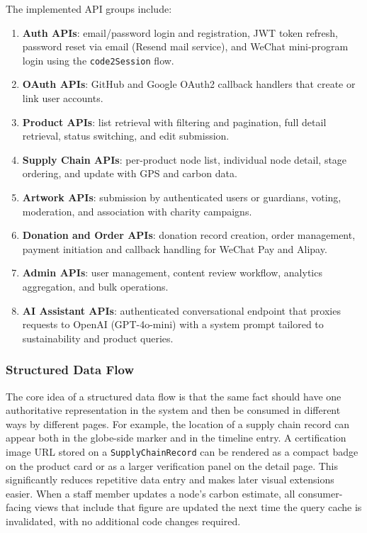 \documentclass[11pt]{article}
\begin{document}
The implemented API groups include:
\begin{enumerate}[leftmargin=2.2em]
    \item \textbf{Auth APIs}: email/password login and registration, JWT token refresh, password reset via email (Resend mail service), and WeChat mini-program login using the \texttt{code2Session} flow.
    \item \textbf{OAuth APIs}: GitHub and Google OAuth2 callback handlers that create or link user accounts.
    \item \textbf{Product APIs}: list retrieval with filtering and pagination, full detail retrieval, status switching, and edit submission.
    \item \textbf{Supply Chain APIs}: per-product node list, individual node detail, stage ordering, and update with GPS and carbon data.
    \item \textbf{Artwork APIs}: submission by authenticated users or guardians, voting, moderation, and association with charity campaigns.
    \item \textbf{Donation and Order APIs}: donation record creation, order management, payment initiation and callback handling for WeChat Pay and Alipay.
    \item \textbf{Admin APIs}: user management, content review workflow, analytics aggregation, and bulk operations.
    \item \textbf{AI Assistant APIs}: authenticated conversational endpoint that proxies requests to OpenAI (GPT-4o-mini) with a system prompt tailored to sustainability and product queries.
\end{enumerate}

\subsubsection{Structured Data Flow}
The core idea of a structured data flow is that the same fact should have one authoritative representation in the system and then be consumed in different ways by different pages. For example, the location of a supply chain record can appear both in the globe-side marker and in the timeline entry. A certification image URL stored on a \texttt{SupplyChainRecord} can be rendered as a compact badge on the product card or as a larger verification panel on the detail page. This significantly reduces repetitive data entry and makes later visual extensions easier. When a staff member updates a node's carbon estimate, all consumer-facing views that include that figure are updated the next time the query cache is invalidated, with no additional code changes required.
\end{document}
